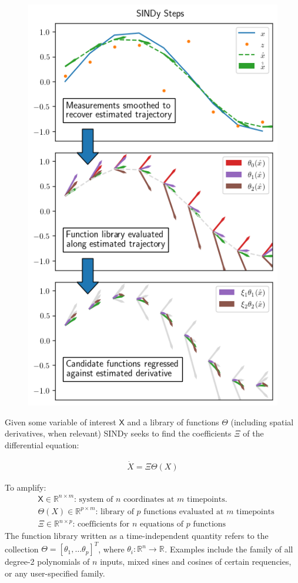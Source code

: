 \documentclass{article}
\newcommand{\mat}[1]{\boldsymbol{\mathsf{#1}}}
\newcommand{\R}[1]{\mathbb{R}^{#1}}
\begin{document}
\begin{figure}
    \includegraphics{images/explain_sindy}
\end{figure}


Given some variable of interest $\mat X$ and a library of functions $\mat \Theta$ (including spatial derivatives, when relevant) SINDy seeks to find the coefficients $\mat \Xi$ of the differential equation:

\begin{align}
    \label{eqn:sindy_ode}
    \dot X = \Xi\Theta(X)
\end{align}

To amplify:
\begin{align*}
    &\mat X \in \R{n \times m}\text{: system of $n$ coordinates at $m$ timepoints.}\\
    &\mat \Theta(X) \in \R{p \times m}\text{: library of $p$ functions evaluated at $m$ timepoints}\\
    &\mat \Xi \in \R{n \times p}\text{: coefficients for $n$ equations of $p$ functions}
\end{align*}
The function library written as a time-independent quantity refers to the collection $\mat \Theta = [\theta_1, \dots \theta_p]^T$, where $\theta_i: \R{n}\rightarrow\R{}$. Examples include the family of all degree-2 polynomials of $n$ inputs, mixed sines and cosines of certain requencies, or any user-specified family.
\end{document}

